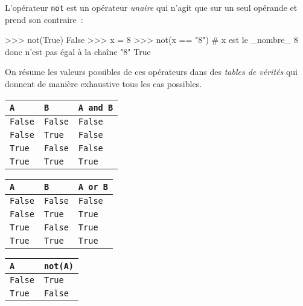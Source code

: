 L'opérateur \texttt{not} est un opérateur \textit{unaire} qui n'agit que sur un seul opérande et
prend son contraire~:

\begin{pythoncode}
>>> not(True)
False
>>> x = 8
>>> not(x == "8")   # x est le _nombre_ 8 donc n'est pas égal à la chaîne "8"
True
\end{pythoncode}

On résume les valeurs possibles de ces opérateurs dans des \textit{tables de v\'{e}rit\'{e}s}
 qui donnent
de manière exhaustive tous les cas possibles.

\begin{multicols}{3}
{\footnotesize
{}
\tabulinesep=1.5mm
\begin{tabu}to
\hline
{}
\texttt{A} & \texttt{B} & \texttt{A and B}\\
\hline
{}
\texttt{False} & \texttt{False} & \texttt{False}\\
\texttt{False} & \texttt{True} & \texttt{False}\\
\texttt{True} & \texttt{False} & \texttt{False}\\
\texttt{True} & \texttt{True} & \texttt{True}\\
\hline
\end{tabu}

\begin{tabu}to
\hline
{}
\texttt{A} & \texttt{B} & \texttt{A or B}\\
\hline
{}
\texttt{False} & \texttt{False} & \texttt{False}\\
\texttt{False} & \texttt{True} & \texttt{True}\\
\texttt{True} & \texttt{False} & \texttt{True}\\
\texttt{True} & \texttt{True} & \texttt{True}\\
\hline
\end{tabu}

\begin{tabu}to\linewidth{|X[c,1]|X[c,2]|}
\hline
{}
\texttt{A} & \texttt{not(A)}\\
\hline
{}
\texttt{False} & \texttt{True}\\
\texttt{True} & \texttt{False}\\
\hline
\end{tabu}
}
\end{multicols}

